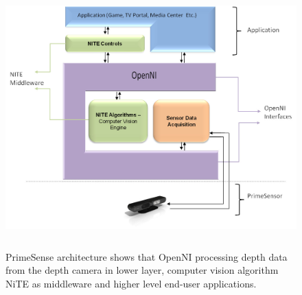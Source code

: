 \begin{figure}
	[h] \centering 
	\includegraphics[height=10cm]{figures/content/ni-arch.jpg} \caption{ PrimeSense architecture shows that OpenNI processing depth data from the depth camera in lower layer, computer vision algorithm NiTE as middleware and higher level end-user applications.  \cite{nite-spec} } \label{fg:ni:arch} 
\end{figure}
